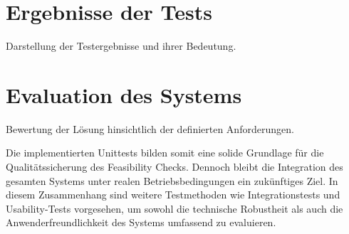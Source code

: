 \section{Ergebnisse der Tests}
Darstellung der Testergebnisse und ihrer Bedeutung.

\section{Evaluation des Systems}
Bewertung der Lösung hinsichtlich der definierten Anforderungen.

Die implementierten Unittests bilden somit eine solide Grundlage für die Qualitätssicherung des Feasibility Checks. Dennoch bleibt die Integration des gesamten Systems unter realen Betriebsbedingungen ein zukünftiges Ziel. In diesem Zusammenhang sind weitere Testmethoden wie Integrationstests und Usability-Tests vorgesehen, um sowohl die technische Robustheit als auch die Anwenderfreundlichkeit des Systems umfassend zu evaluieren.